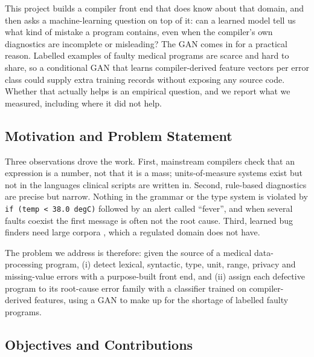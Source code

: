 \documentclass[12pt,a4paper]{article}
\newcommand{\code}[1]{\texttt{#1}}
\begin{document}
This project builds a compiler front end that does know about that domain, and then asks a machine-learning question
on top of it: can a learned model tell us what kind of mistake a program contains, even when the compiler's own
diagnostics are incomplete or misleading? The GAN comes in for a practical reason. Labelled examples of faulty
medical programs are scarce and hard to share, so a conditional GAN that learns compiler-derived feature vectors per
error class could supply extra training records without exposing any source code. Whether that actually helps is an
empirical question, and we report what we measured, including where it did not help.

\subsection{Motivation and Problem Statement}

Three observations drove the work. First, mainstream compilers check that an expression is a number, not that it is
a mass; units-of-measure systems exist \cite{kennedy1994} but not in the languages clinical scripts are written in.
Second, rule-based diagnostics are precise but narrow. Nothing in the grammar or the type system is violated by
\code{if (temp < 38.0 degC)} followed by an alert called ``fever'', and when several faults coexist the first message
is often not the root cause. Third, learned bug finders need large corpora \cite{allamanis2018,pradel2018}, which a
regulated domain does not have.

The problem we address is therefore: given the source of a medical data-processing program, (i) detect lexical,
syntactic, type, unit, range, privacy and missing-value errors with a purpose-built front end, and (ii) assign each
defective program to its root-cause error family with a classifier trained on compiler-derived features, using a GAN
to make up for the shortage of labelled faulty programs.

\subsection{Objectives and Contributions}
\end{document}
